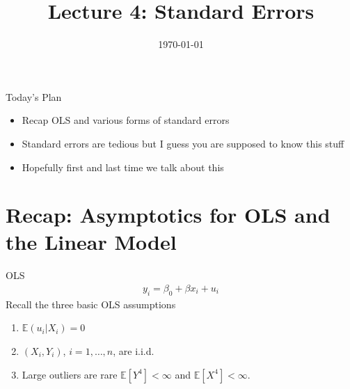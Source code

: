 \documentclass[aspectratio=169,11pt]{beamer}
\title{Lecture 4: Standard Errors}
\date{\today}
\begin{document}
\maketitle



\begin{frame}{Today's Plan}
\begin{itemize}
\item Recap OLS and various forms of standard errors
\item Standard errors are tedious but I guess you are supposed to know this stuff
\item Hopefully first and last time we talk about this
\end{itemize}
\end{frame}


\section{Recap: Asymptotics for OLS and the Linear Model}


\begin{frame}{OLS}
\begin{align*}
y_i = \beta_0 + \beta x_i + u_i
\end{align*}
Recall the three basic OLS assumptions
\begin{enumerate}
\item $\mathbb{E}(u_i |X_i ) = 0$
\item $(X_i,Y_i)$, $i =1,\ldots,n$, are i.i.d.
\item Large outliers are rare $\mathbb{E}[Y^4]< \infty$ and $\mathbb{E}[X^4]<\infty$.
\end{enumerate}
\end{frame}
\end{document}
